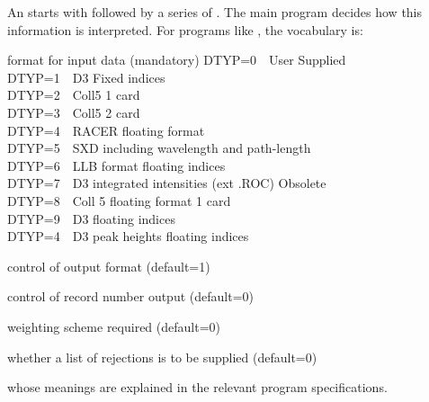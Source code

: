  
\cardend\newpage
{}
%
An  starts with  followed by a series of
\cwnscomma.
The main program decides how this information is interpreted.
\p\ms
For programs like ,  the vocabulary is:\\[0.5ex]
\begin{list} {} {\setlength{\labelwidth}{2.5cm}
  \setlength{\parsep}{-1ex}
  \setlength{\leftmargin}{\labelwidth}
 \addtolength{\leftmargin}{0.5cm}}
\item[\bd{DTYP} \hfill] format for input data (mandatory)
DTYP=0\ \ User Supplied\\
DTYP=1\ \ D3 Fixed indices\\
DTYP=2\ \ Coll5 1 card\\
DTYP=3\ \ Coll5 2 card\\
DTYP=4\ \ RACER floating format\\
DTYP=5\ \ SXD including wavelength and path-length\\
DTYP=6\ \ LLB format floating indices\\
DTYP=7\ \ D3 integrated intensities (ext .ROC) Obsolete\\
DTYP=8\ \ Coll 5 floating format 1 card\\
DTYP=9\ \ D3 floating indices\\
DTYP=4\ \ D3 peak heights floating indices\\

\item[\bd{PRIN} \hfill] control of output format (default=1)
\item[\bd{RNUM} \hfill] control of record number output (default=0)
\item[\bd{WGHT} \hfill] weighting scheme required (default=0)
\item[\bd{REJ} \hfill] whether a list of rejections is to be supplied (default=0)\end{list}
%
whose meanings are explained in the relevant program specifications.
